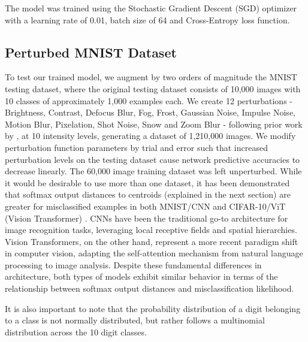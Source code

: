 The model was trained using the Stochastic Gradient Descent (SGD) optimizer with a learning rate of 0.01, batch size of 64 and Cross-Entropy loss function. 


\subsection{Perturbed MNIST Dataset}
\label{methods:PerturbedMNISTDataset}

To test our trained model, we augment by two orders of magnitude the MNIST testing dataset, where the original testing dataset consists of 10,000 images with 10 classes of approximately 1,000 examples each. We create 12 perturbations - Brightness, Contrast, Defocus Blur, Fog, Frost, Gaussian Noise, Impulse Noise, Motion Blur, Pixelation, Shot Noise, Snow and Zoom Blur - following prior work by \cite{hendrycks2019benchmarking}, at 10 intensity levels, generating a dataset of 1,210,000 images. We modify perturbation function parameters by trial and error such that increased perturbation levels on the testing dataset cause network predictive accuracies to decrease linearly. The 60,000 image training dataset was left unperturbed. While it would be desirable to use more than one dataset, it has been demonstrated that softmax output distances to centroids (explained in the next section) are greater for misclassified examples in both MNIST/CNN and CIFAR-10/ViT (Vision Transformer) \cite{sikar2024acceptautomatedpredictionsdefer}. CNNs have been the traditional go-to architecture for image recognition tasks, leveraging local receptive fields and spatial hierarchies. Vision Transformers, on the other hand, represent a more recent paradigm shift in computer vision, adapting the self-attention mechanism from natural language processing to image analysis. Despite these fundamental differences in architecture, both types of models exhibit similar behavior in terms of the relationship between softmax output distances and misclassification likelihood. 

It is also important to note that the probability distribution of a digit belonging to a class is not normally distributed, but rather follows a multinomial distribution across the 10 digit classes.


